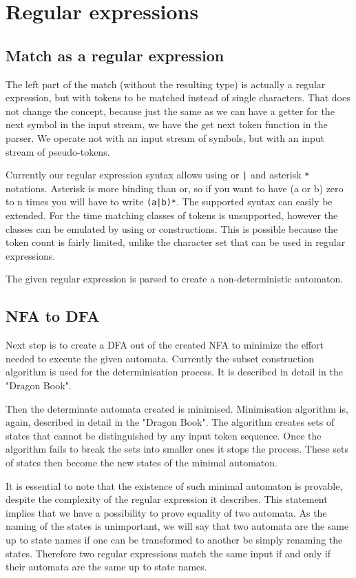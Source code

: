 \section{\label{sec:regexps}Regular expressions}

\subsection{Match as a regular expression}
The left part of the match (without the resulting type) is actually a
regular expression, but with tokens to be matched instead of single
characters. That does not change the concept, because just the same as
we can have a getter for the next symbol in the input stream, we have
the get next token function in the parser. We operate not with an input
stream of symbols, but with an input stream of pseudo-tokens.

Currently our regular expression syntax allows using or \verb/|/ and asterisk
\verb|*| notations. Asterisk is more binding than or, so if you want to have (a
or b) zero to n times you will have to write \verb/(a|b)*/. The supported
syntax can easily be extended.  For the time matching classes of tokens is
unsupported, however the classes can be emulated by using or constructions.
This is possible because the token count is fairly limited, unlike the
character set that can be used in regular expressions.

The given regular expression is parsed to create a non-deterministic automaton.

\subsection{NFA to DFA}
Next step is to create a DFA out of the created NFA to minimize the effort
needed to execute the given automata. Currently the subset construction
algorithm is used for the determinisation process. It is described in detail in
the "Dragon Book".

Then the determinate automata created is minimised. Minimisation algorithm is,
again, described in detail in the "Dragon Book". The algorithm creates sets of
states that cannot be distinguished by any input token sequence. Once the
algorithm fails to break the sets into smaller ones it stops the process. These
sets of states then become the new states of the minimal automaton.

It is essential to note that the existence of such minimal automaton is
provable, despite the complexity of the regular expression it describes. This
statement implies that we have a possibility to prove equality of two automata.
As the naming of the states is unimportant, we will say that two automata are
the same up to state names if one can be transformed to another be simply
renaming the states. Therefore two regular expressions match the same input if
and only if their automata are the same up to state names.


